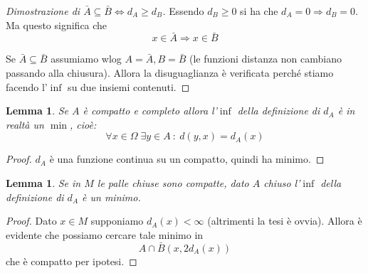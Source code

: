 \documentclass[a4paper,10pt]{article}
\newcounter{counter1}
\theoremstyle{plain}
\newtheorem{mylem}[counter1]{Lemma}
\theoremstyle{definition}
\theoremstyle{remark}
\newcommand{\pa}[1]{\left(#1\right)}
\begin{document}
\begin{proof}[Dimostrazione di $\bar A \subseteq \bar B
  \Leftrightarrow d_A \ge d_B$]
  Essendo $d_B \ge 0$ si ha che $d_A = 0 \Rightarrow d_B = 0$. Ma
  questo significa che 
  \[ x \in \bar A \Rightarrow x \in \bar B \]

  Se $\bar A \subseteq \bar B$ assumiamo wlog $A = \bar A, B = \bar B$
  (le funzioni distanza non cambiano passando alla chiusura). Allora
  la disuguaglianza è verificata perché stiamo facendo l'$\inf$ su due
  insiemi contenuti.  
\end{proof}


\begin{mylem}
  Se $A$ è compatto e completo allora l'$\inf$ della definizione di
  $d_A$ è in realtà un $\min$, cioè:
  \[ \forall x \in \Omega \; \exists y \in A \ :\ d(y,x) = d_A(x) \]
\end{mylem}
\begin{proof}
  $d_A$ è una funzione continua su un compatto, quindi ha minimo.
\end{proof}

\begin{mylem}\label{lem:pallechiusecompattemin}
  Se in $M$ le palle chiuse sono compatte, dato $A$ chiuso l'$\inf$
  della definizione di $d_A$ è un minimo.
\end{mylem}
\begin{proof}
  Dato $x\in M$ supponiamo $d_A(x) < \infty$ (altrimenti la tesi è
  ovvia). Allora è evidente che possiamo cercare tale minimo in 
  \[ A \cap \bar B\pa{x,2 d_A(x)} \]
  che è compatto per ipotesi.
\end{proof}
\end{document}
